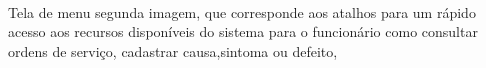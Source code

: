\begin{figure}[htb]
	\centering
	\mbox{%
	}	
	
\end{figure}
\newpage
Tela de menu segunda imagem, que corresponde aos atalhos para um rápido acesso aos recursos disponíveis do sistema para o funcionário
como consultar ordens de serviço, cadastrar causa,sintoma ou defeito,
